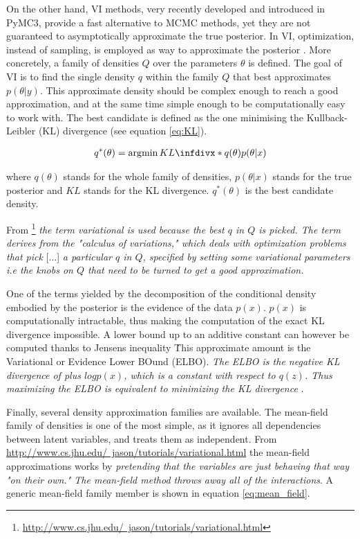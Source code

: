On the other hand, \ac{VI} methods, very recently developed and introduced in PyMC3, provide a fast alternative to \ac{MCMC} methods, yet they are not guaranteed to asymptotically approximate the true posterior. In \ac{VI}, optimization, instead of sampling, is employed as way to approximate the posterior \cite{Blei2018}. More concretely, a family of densities $Q$ over the parameters $\theta$ is defined. The goal of \ac{VI} is to find the single density $q$ within the family $Q$ that best approximates $p(\theta|y)$. This approximate density should be complex enough to reach a good approximation, and at the same time simple enough to be computationally easy to work with. The best candidate is defined as the one minimising the Kullback-Leibler (\ac{KL}) divergence (see equation \ref{eq:KL}).

\begin{gather}\label{eq:KL}
q^*(\theta) = \argmin \infdiv*{q(\theta)}{p(\theta|x)}
\end{gather}

where $q(\theta)$ stands for the whole family of densities, $p(\theta|x)$ stands for the true posterior and $KL$ stands for the \ac{KL} divergence. $q^*(\theta)$ is the best candidate density.

From \footnote{\href{http://www.cs.jhu.edu/~jason/tutorials/variational.html}{http://www.cs.jhu.edu/~jason/tutorials/variational.html}} \textit{the term variational is used because the best $q$ in $Q$ is picked. The term derives from the "calculus of variations," which deals with optimization problems that pick} [...] \textit{a particular $q$ in $Q$, specified by setting some variational parameters i.e the knobs on $Q$ that need to be turned to get a good approximation.}


One of the terms yielded by the decomposition of the conditional density embodied by the posterior is the evidence of the data $p(x)$.  $p(x)$ is computationally intractable, thus making the computation of the exact \ac{KL} divergence impossible. A lower bound up to an additive constant can however be computed thanks to Jensen\textquotesingle s inequality \cite{jensen1906fonctions} \. This approximate amount is the Variational or Evidence Lower BOund (\ac{ELBO}). \textit{The \ac{ELBO} is the negative \ac{KL} divergence of plus $logp(x)$, which is a constant with respect to $q(z)$. Thus maximizing
the \ac{ELBO} is equivalent to minimizing the \ac{KL} divergence} \cite{Blei2018}.

Finally, several density approximation families are available. The mean-field family of densities is one of the most simple, as it ignores all dependencies between latent variables, and treats them as independent. From \href{http://www.cs.jhu.edu/~jason/tutorials/variational.html}{http://www.cs.jhu.edu/~jason/tutorials/variational.html} the mean-field approximations works by \textit{pretending that the variables are just behaving that way "on their own." The mean-field method throws away all of the interactions}. A generic mean-field family member is shown in equation \ref{eq:mean_field}.

